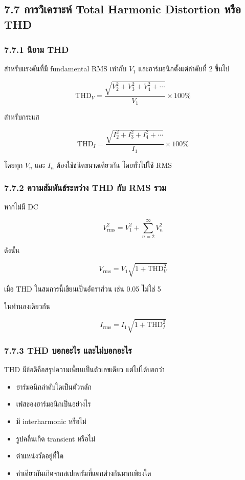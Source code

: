 \subsection{7.7 การวิเคราะห์ Total Harmonic Distortion หรือ THD}

\subsubsection{7.7.1 นิยาม THD}

สำหรับแรงดันที่มี fundamental RMS เท่ากับ $V_1$ และฮาร์มอนิกตั้งแต่ลำดับที่ 2 ขึ้นไป

\[
\mathrm{THD}_V=\frac{\sqrt{V_2^2+V_3^2+V_4^2+\cdots}}{V_1}\times100\%
\]

สำหรับกระแส

\[
\mathrm{THD}_I=\frac{\sqrt{I_2^2+I_3^2+I_4^2+\cdots}}{I_1}\times100\%
\]

โดยทุก $V_n$ และ $I_n$ ต้องใช้ชนิดขนาดเดียวกัน โดยทั่วไปใช้ RMS

\subsubsection{7.7.2 ความสัมพันธ์ระหว่าง THD กับ RMS รวม}

หากไม่มี DC

\[
V_{\mathrm{rms}}^2=V_1^2+\sum_{n=2}^{\infty}V_n^2
\]

ดังนั้น

\[
V_{\mathrm{rms}}=V_1\sqrt{1+\mathrm{THD}_V^2}
\]

เมื่อ THD ในสมการนี้เขียนเป็นอัตราส่วน เช่น 0.05 ไม่ใช่ 5

ในทำนองเดียวกัน

\[
I_{\mathrm{rms}}=I_1\sqrt{1+\mathrm{THD}_I^2}
\]

\subsubsection{7.7.3 THD บอกอะไร และไม่บอกอะไร}

THD มีข้อดีคือสรุปความเพี้ยนเป็นตัวเลขเดียว แต่ไม่ได้บอกว่า

\begin{itemize}
    \item ฮาร์มอนิกลำดับใดเป็นตัวหลัก
    \item เฟสของฮาร์มอนิกเป็นอย่างไร
    \item มี interharmonic หรือไม่
    \item รูปคลื่นเกิด transient หรือไม่
    \item ตำแหน่งวัดอยู่ที่ใด
    \item ค่าเดียวกันเกิดจากสเปกตรัมที่แตกต่างกันมากเพียงใด
\end{itemize}

